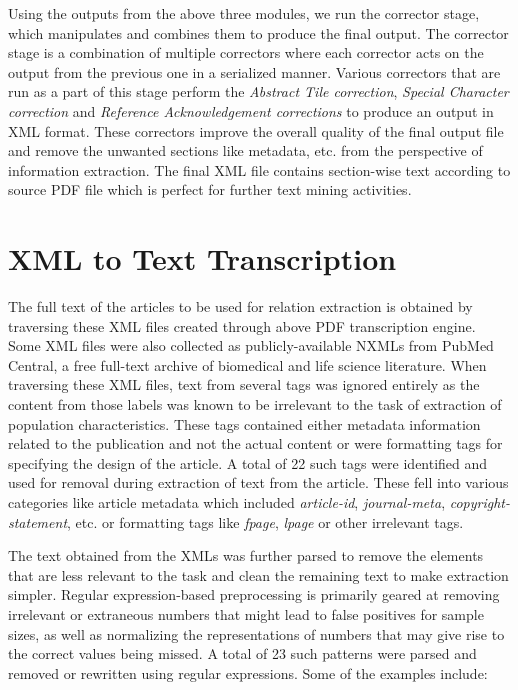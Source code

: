 Using the outputs from the above three modules, we run the corrector stage, which manipulates and combines them to produce the final output. The corrector stage is a combination of multiple correctors where each corrector acts on the output from the previous one in a serialized manner. Various correctors that are run as a part of this stage perform the {\it Abstract Tile correction}, {\it Special Character correction} and {\it Reference Acknowledgement corrections} to produce an output in XML format. These correctors improve the overall quality of the final output file and remove the unwanted sections like metadata, etc. from the perspective of information extraction. The final XML file contains section-wise text according to source PDF file which is perfect for further text mining activities. 

\section{XML to Text Transcription}
\label{section:xml-to-text-transcription}
The full text of the articles to be used for relation extraction is obtained by traversing these XML files created through above PDF transcription engine. Some XML files were also collected as publicly-available NXMLs from PubMed Central, a free full-text archive of biomedical and life science literature. When traversing these XML files, text from several tags was ignored entirely as the content from those labels was known to be irrelevant to the task of extraction of population characteristics. These tags contained either metadata information related to the publication and not the actual content or were formatting tags for specifying the design of the article. A total of 22 such tags were identified and used for removal during extraction of text from the article. These fell into various categories like article metadata which included {\it article-id}, {\it journal-meta}, {\it copyright-statement}, etc. or formatting tags like {\it fpage}, {\it lpage} or other irrelevant tags.

The text obtained from the XMLs was further parsed to remove the elements that are less relevant to the task and clean the remaining text to make extraction simpler. Regular expression-based preprocessing is primarily geared at removing irrelevant or extraneous numbers that might lead to false positives for sample sizes, as well as normalizing the representations of numbers that may give rise to the correct values being missed. A total of 23 such patterns were parsed and removed or rewritten using regular expressions. Some of the examples include:

